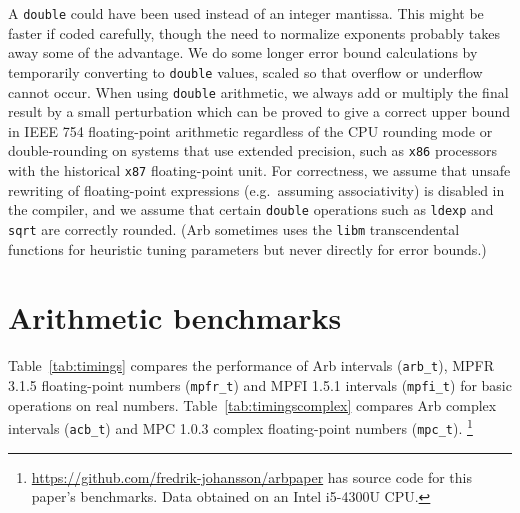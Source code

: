\documentclass[10pt,journal,compsoc,cspaper]{IEEEtran}
\begin{document}
A \texttt{double} could have been used instead of an integer mantissa.
This might be faster if coded carefully, though the need to normalize
exponents probably takes away some of the advantage.
We do some longer error bound calculations by temporarily
converting to \texttt{double} values, scaled so that overflow
or underflow cannot occur.
When using \texttt{double} arithmetic, we always 
add or multiply the final result by a small perturbation which can be
proved to give a correct upper bound in IEEE 754 floating-point
arithmetic regardless of the CPU rounding mode
or double-rounding on systems that use extended precision,
such as \texttt{x86} processors with the historical \texttt{x87} floating-point unit.
For correctness, we assume that unsafe rewriting of floating-point expressions
(e.g.\ assuming associativity) is disabled in the compiler,
and we assume that certain \texttt{double} operations such
as \texttt{ldexp} and \texttt{sqrt} are correctly rounded.
(Arb sometimes uses the \texttt{libm}
transcendental functions for heuristic tuning parameters
but never directly for error bounds.)

\section{Arithmetic benchmarks}
\label{sect:benchmarks}

Table~\ref{tab:timings} compares the performance of
Arb intervals (\texttt{arb\_t}),
MPFR 3.1.5 floating-point numbers (\texttt{mpfr\_t}) and MPFI 1.5.1 intervals (\texttt{mpfi\_t}) for
basic operations on real numbers.
Table~\ref{tab:timingscomplex}
compares Arb complex intervals (\texttt{acb\_t}) and
MPC 1.0.3 complex floating-point numbers (\texttt{mpc\_t}).
\footnote{\url{https://github.com/fredrik-johansson/arbpaper} has source code for this paper's benchmarks. Data obtained on an Intel i5-4300U CPU.}
\end{document}
